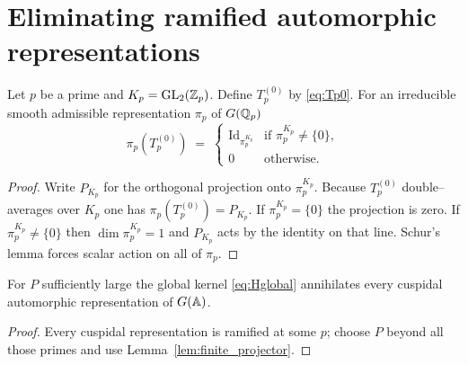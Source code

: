 \section{Eliminating ramified automorphic representations}

\begin{lemma}\label{lem:finite_projector}
Let $p$ be a prime and $K_p=\mathrm{GL}_2(\Bbb Z_p)$.
Define $T_p^{(0)}$ by \eqref{eq:Tp0}.
For an irreducible smooth admissible representation $\pi_p$
of $G(\Bbb Q_p)$
\[
   \pi_p(T_p^{(0)}) \;=\;
   \begin{cases}
      \mathrm{Id}_{\pi_p^{K_p}} & \text{if }\pi_p^{K_p}\neq\{0\},\\[4pt]
      0 & \text{otherwise.}
   \end{cases}
\]
\end{lemma}

\begin{proof}
Write $P_{K_p}$ for the orthogonal projection
onto $\pi_p^{K_p}$.  Because $T_p^{(0)}$ double–averages
over $K_p$ one has $\pi_p(T_p^{(0)})=P_{K_p}$.
If $\pi_p^{K_p}=\{0\}$ the projection is zero.
If $\pi_p^{K_p}\neq\{0\}$ then $\dim\pi_p^{K_p}=1$
and $P_{K_p}$ acts by the identity on that line.
Schur's lemma forces scalar action on all of $\pi_p$.
\end{proof}

\begin{corollary}\label{cor:cusp_killed}
For $P$ sufficiently large the global kernel
\eqref{eq:Hglobal} annihilates every cuspidal automorphic
representation of $G(\Bbb A)$.
\end{corollary}

\begin{proof}
Every cuspidal representation is ramified at
some $p$; choose $P$ beyond all those primes and use
Lemma~\ref{lem:finite_projector}.
\end{proof} 
